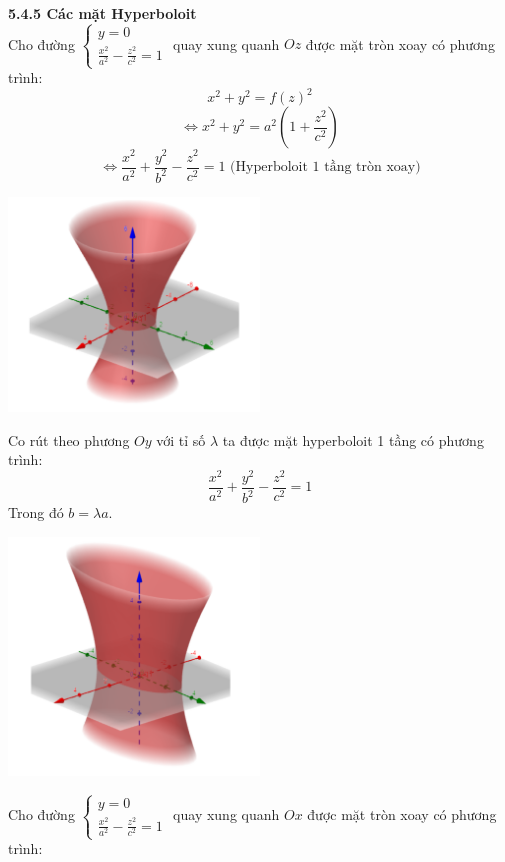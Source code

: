 \documentclass[12pt,a4]{article}
\begin{document}
\begin{titlepage}
\begin{center}
\end{center}
\vspace{0.2cm}
\textbf{5.4.5 Các mặt Hyperboloit}\\
\vspace{0.2cm}
Cho đường $\begin{cases}y = 0\\\frac{x^2}{a^2} - \frac{z^2}{c^2} = 1\end{cases}$ quay xung quanh $Oz$ được mặt tròn xoay có phương trình:
\[
x^2 + y^2 = f(z)^2
\]
\[
\Leftrightarrow x^2 + y^2 = a^2(1 + \frac{z^2}{c^2})
\]
\[
\Leftrightarrow \frac{x^2}{a^2} + \frac{y^2}{b^2} - \frac{z^2}{c^2} = 1 \text{ (Hyperboloit 1 tầng tròn xoay)}
\]
\begin{center}
    \includegraphics[width=0.5\textwidth]{image/hybepol1.png}
\end{center}
Co rút theo phương $Oy$ với tỉ số $\lambda$ ta được mặt hyperboloit 1 tầng có phương trình:
\[
    \frac{x^2}{a^2} + \frac{y^2}{b^2} - \frac{z^2}{c^2} = 1
\]
Trong đó $b = \lambda a.$\\
\begin{center}
    \includegraphics[width=0.5\textwidth]{image/hybepol2.png}
\end{center}
Cho đường $\begin{cases}y = 0\\\frac{x^2}{a^2} - \frac{z^2}{c^2} = 1\end{cases}$ quay xung quanh $Ox$ được mặt tròn xoay có phương trình:

\end{titlepage}
\end{document}
